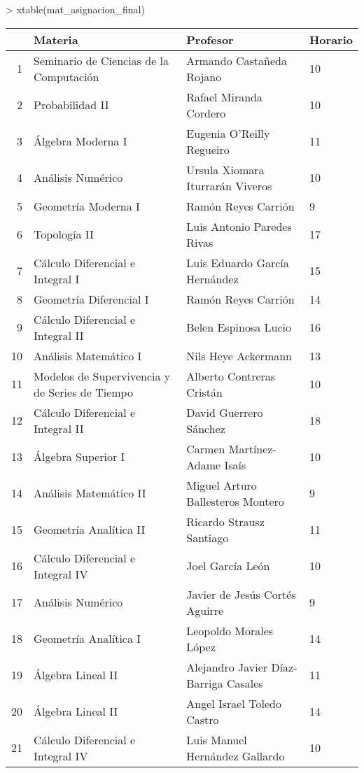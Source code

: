 > xtable(mat_asignacion_final)
\begin{table}[ht]
\centering
\begin{tabular}{rlll}
  \hline
 & Materia & Profesor & Horario \\ 
  \hline
1 & Seminario de Ciencias de la Computación & Armando Castañeda Rojano & 10 \\ 
  2 & Probabilidad II & Rafael Miranda Cordero & 10 \\ 
  3 & Álgebra Moderna I & Eugenia O'Reilly Regueiro & 11 \\ 
  4 & Análisis Numérico & Ursula Xiomara Iturrarán Viveros & 10 \\ 
  5 & Geometría Moderna I & Ramón Reyes Carrión & 9 \\ 
  6 & Topología II & Luis Antonio Paredes Rivas & 17 \\ 
  7 & Cálculo Diferencial e Integral I & Luis Eduardo García Hernández & 15 \\ 
  8 & Geometría Diferencial I & Ramón Reyes Carrión & 14 \\ 
  9 & Cálculo Diferencial e Integral II & Belen Espinosa Lucio & 16 \\ 
  10 & Análisis Matemático I & Nils Heye Ackermann & 13 \\ 
  11 & Modelos de Supervivencia y de Series de Tiempo & Alberto Contreras Cristán & 10 \\ 
  12 & Cálculo Diferencial e Integral II & David Guerrero Sánchez & 18 \\ 
  13 & Álgebra Superior I & Carmen Martínez-Adame Isaís & 10 \\ 
  14 & Análisis Matemático II & Miguel Arturo Ballesteros Montero & 9 \\ 
  15 & Geometría Analítica II & Ricardo Strausz Santiago & 11 \\ 
  16 & Cálculo Diferencial e Integral IV & Joel García León & 10 \\ 
  17 & Análisis Numérico & Javier de Jesús Cortés Aguirre & 9 \\ 
  18 & Geometría Analítica I & Leopoldo Morales López & 14 \\ 
  19 & Álgebra Lineal II & Alejandro Javier Díaz-Barriga Casales & 11 \\ 
  20 & Álgebra Lineal II & Angel Israel Toledo Castro & 14 \\ 
  21 & Cálculo Diferencial e Integral IV & Luis Manuel Hernández Gallardo & 10 \\ 

\end{tabular}
\end{table}
